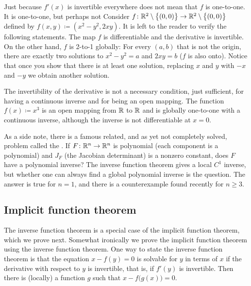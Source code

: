 \begin{example}
Just because $f'(x)$ is invertible everywhere does not
mean that $f$ is
one-to-one.  It is  one-to-one, but perhaps not
Consider $f \colon {\mathbb{R}}^2 \setminus \bigl\{ (0,0) \bigr\} \to
{\mathbb{R}}^2 \setminus \bigl\{ (0,0) \bigr\}$ defined
by $f(x,y) \coloneqq (x^2-y^2,2xy)$.
It is left to the reader to verify the following statements.
The map $f$ is differentiable and the derivative is invertible.
On the other hand, $f$ is 2-to-1 globally: For every
$(a,b)$ that is not the origin, there are exactly two
solutions to $x^2-y^2=a$ and $2xy=b$ ($f$ is also onto).  Notice that
once you show that there is at least one solution,
replacing $x$ and $y$ with $-x$ and $-y$ we obtain another solution.
\end{example}

The invertibility of the derivative is not a necessary
condition, just sufficient, for having a continuous inverse and for being an open
mapping.  The function $f(x) \coloneqq x^3$ is an open mapping from ${\mathbb{R}}$
to ${\mathbb{R}}$ and is globally one-to-one with a continuous inverse, although the
inverse is not differentiable at $x=0$.

\medskip

As a side note, there is a famous related, and as yet not completely solved, problem
called the \emph{}.  If $F \colon {\mathbb{R}}^n \to
{\mathbb{R}}^n$ is polynomial (each component is a polynomial) and $J_F$
(the Jacobian determinant) is a nonzero
constant, does $F$ have a polynomial inverse?
The inverse function theorem gives a local $C^1$ inverse,
but whether one can always
find a global polynomial inverse is the question.
The answer is true for $n=1$, and there is a counterexample
found recently for $n \geq 3$.

\subsection{Implicit function theorem}

The inverse function theorem is a special case of the implicit
function theorem, which we prove next.  Somewhat ironically we 
prove the implicit function theorem using the inverse function theorem.
One way to state the inverse function theorem is that
the equation $x-f(y) = 0$ is solvable for $y$ in terms of $x$ if the derivative
with respect to $y$ is invertible, that is, if $f'(y)$ is invertible.
Then there is (locally) a
function $g$ such that $x-f\bigl(g(x)\bigr) = 0$.

